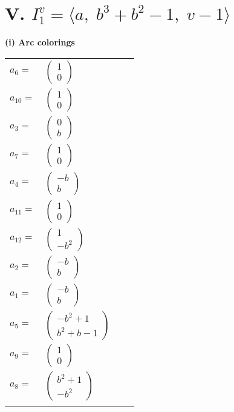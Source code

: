 \documentclass[1p]{elsarticle_modified}
\theoremstyle{definition}
\begin{document}
\centering \section*{V. $I^v_{1}= \langle a,\;b^3+b^2-1,\;v-1 \rangle$}
\flushleft \textbf{(i) Arc colorings}\\
\begin{tabular}{m{7pt} m{180pt} m{7pt} m{180pt} }
\flushright $a_{6}=$&$\begin{pmatrix}1\\0\end{pmatrix}$ \\
\flushright $a_{10}=$&$\begin{pmatrix}1\\0\end{pmatrix}$ \\
\flushright $a_{3}=$&$\begin{pmatrix}0\\b\end{pmatrix}$ \\
\flushright $a_{7}=$&$\begin{pmatrix}1\\0\end{pmatrix}$ \\
\flushright $a_{4}=$&$\begin{pmatrix}- b\\b\end{pmatrix}$ \\
\flushright $a_{11}=$&$\begin{pmatrix}1\\0\end{pmatrix}$ \\
\flushright $a_{12}=$&$\begin{pmatrix}1\\- b^2\end{pmatrix}$ \\
\flushright $a_{2}=$&$\begin{pmatrix}- b\\b\end{pmatrix}$ \\
\flushright $a_{1}=$&$\begin{pmatrix}- b\\b\end{pmatrix}$ \\
\flushright $a_{5}=$&$\begin{pmatrix}- b^2+1\\b^2+b-1\end{pmatrix}$ \\
\flushright $a_{9}=$&$\begin{pmatrix}1\\0\end{pmatrix}$ \\
\flushright $a_{8}=$&$\begin{pmatrix}b^2+1\\- b^2\end{pmatrix}$\\&\end{tabular}
\end{document}
